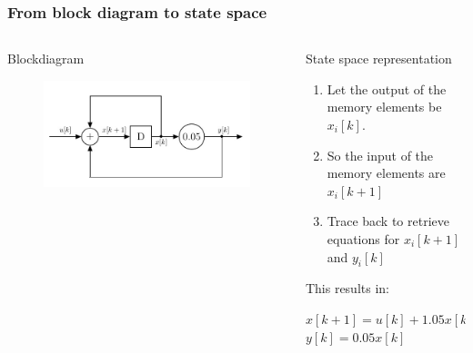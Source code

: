 \begin{frame}
\frametitle{From block diagram to state space }
\begin{columns}

\begin{column}{0.5\textwidth}
	\begin{block}{Blockdiagram}
		\vspace{2.2em}
		\begin{figure}
			\centering
			\includegraphics[width=1\linewidth]{Images/discrete_time_systems_3}
			\label{fig:discrete_time_systems_3}
		\end{figure}
		\vspace{2.2em}
	\end{block}
	
\end{column}
\begin{column}{0.5\textwidth}
	\begin{block}{State space representation}
		\begin{enumerate}
			\item Let the output of the memory elements be $x_{i}[k]$. 
			\item So the input of the memory elements are $x_i[k+1]$
			\item Trace back to retrieve equations for $x_i[k+1] $   and $y_i[k]$ 
		\end{enumerate}
		This results in:
		\vspace{-1em}
		\begin{center}
				$x[k+1] = u[k] + 1.05 x[k] $
				$y[k] = 0.05 x[k]$
		\end{center}
	\end{block}
\end{column}
\end{columns}
\end{frame}
